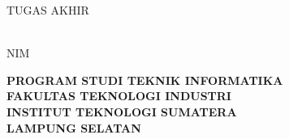 \clearpage
\pagestyle{empty}

\begin{center}
\smallskip

    \begin{figure}[h]
    	\centering
    \end{figure}

	\Large \bfseries \MakeUppercase{\thetitle}
	\vfill

    \Large \uppercase{Tugas Akhir}
    \vfill

    \normalsize \normalfont \theauthor\\
    NIM \printnim
    \vfill

    \large \bfseries
    \uppercase{
        Program Studi Teknik Informatika \\
        Fakultas Teknologi Industri\\
        Institut Teknologi Sumatera\\
        Lampung Selatan
    }\medskip

    \thedate

\end{center}

\clearpage
